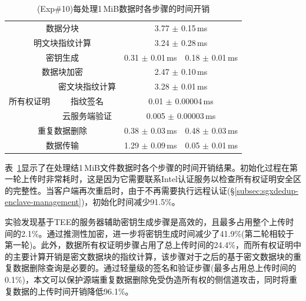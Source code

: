 \begin{table}[!htb]
\begin{tabular}{cccc}
        \multicolumn{2}{c}{数据分块}                & 
        \multicolumn{2}{c}{3.77 $\pm$ 0.15\,ms }                                                                                                                      \\  
        \multicolumn{2}{c}{明文块指纹计算}
                                                    & 
        \multicolumn{2}{c}{3.24 $\pm$ 0.28\,ms}                                                                                                                       \\ 
        \multicolumn{2}{c}{密钥生成}                & 
        0.31 $\pm$ 0.01\,ms                         & 0.18
        $\pm$ 0.01\,ms                                                                                                                                                \\ 
        \multicolumn{2}{c}{数据块加密}              & 
        \multicolumn{2}{c}{2.47 $\pm$ 0.10\,ms }                                                                                                                      \\ 
        \multirow{3}{*}{所有权证明}                 & 密文块指纹计算                                                   & \multicolumn{2}{c}{3.28 $\pm$ 0.01\,ms }     \\ 
                                                    & 指纹签名                                                         & \multicolumn{2}{c}{0.01 $\pm$ 0.00004\,ms }  \\ 
                                                    & 云服务端验证                                                     & \multicolumn{2}{c}{0.005 $\pm$ 0.00003\,ms } \\ 
        \multicolumn{2}{c}{重复数据删除}            & \multicolumn{1}{c}{0.38 $\pm$ 0.03\,ms }                         & 0.48 $\pm$ 0.03\,ms                          \\ 
        \multicolumn{2}{c}{数据传输}                & \multicolumn{1}{c}{1.29 $\pm$ 0.09\,ms }                         & 0.05 $\pm$ 0.01\,ms                          \\ \bottomrule
    \end{tabular}
    \caption{(Exp\#10)每处理1\,MiB数据时各步骤的时间开销}
    \label{tab:sgxdedup-system-breakdown}
\end{table}

表~\ref{tab:sgxdedup-system-breakdown}显示了在处理结1\,MiB文件数据时各个步骤的时间开销结果。初始化过程在第一轮上传时非常耗时，这是因为它需要联系Intel认证服务以检查所有权证明安全区的完整性。当客户端再次重启时，由于不再需要执行远程认证(\S\ref{subsec:sgxdedup-enclave-management})，初始化时间减少91.5\%。

实验发现基于TEE的服务器辅助密钥生成步骤是高效的，且最多占用整个上传时间的2.1\%。通过推测性加密，\sysnameS 进一步将密钥生成时间减少了41.9\%(第二轮相较于第一轮)。此外，数据所有权证明步骤占用了总上传时间的24.4\%，而所有权证明中的主要计算开销是密文数据块的指纹计算，该步骤对于之后的基于密文数据块的重复数据删除查询是必要的。通过轻量级的签名和验证步骤(最多占用总上传时间的0.1\%)，本文可以保护源端重复数据删除免受伪造所有权的侧信道攻击，同时将重复数据的上传时间开销降低96.1\%。

